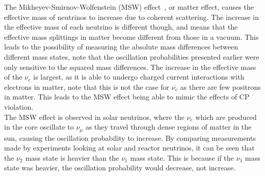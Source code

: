 The Mikheyev-Smirnov-Wolfenstein (MSW) effect~\citep{PhysRevD.17.2369, Mikheev:1986gs}, or matter effect, causes the effective mass of neutrinos to increase due to coherent scattering. The increase in the effective mass of each neutrino is different though, and means that the effective mass splittings in matter become different from those in a vacuum. This leads to the possibility of measuring the absolute mass differences between different mass states, note that the oscillation probabilities presented earlier were only sensitive to the squared mass differences. The increase in the effective mass of the $\nu_{e}$ is largest, as it is able to undergo charged current interactions with electrons in matter, note that this is not the case for $\overline{\nu_{e}}$ as there are few positrons in matter. This leads to the MSW effect being able to mimic the effects of CP violation. \\

The MSW effect is observed in solar neutrinos, where the $\nu_{e}$ which are produced in the core oscillate to $\nu_{\mu}$ as they travel through dense regions of matter in the sun, causing the oscillation probability to increase. By comparing measurements made by experiments looking at solar and reactor neutrinos, it can be seen that the $\nu_{2}$ mass state is heavier than the $\nu_{1}$ mass state. This is because if the $\nu_{1}$ mass state was heavier, the oscillation probability would decrease, not increase. \\

